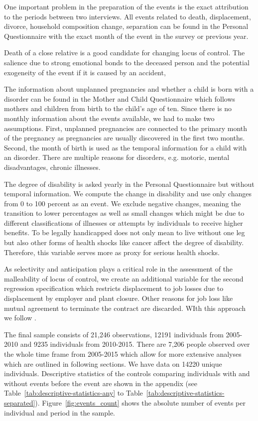 \documentclass[12pt, a4paper, fleqn, parskip]{scrartcl}
\begin{document}
One important problem in the preparation of the events is the exact attribution
to the periods between two interviews. All events related to death,
displacement, divorce, household composition change, separation can be found in
the Personal Questionnaire with the exact month of the event in the survey or
previous year.

Death of a close relative is a good candidate for changing locus of control.
The salience due to strong emotional bonds to the deceased person and the
potential exogeneity of the event if it is caused by an accident,

The information about unplanned pregnancies and whether a child is born with a
disorder can be found in the Mother and Child Questionnaire which follows
mothers and children from birth to the child's age of ten. Since there is no
monthly information about the events available, we had to make two assumptions.
First, unplanned pregnancies are connected to the primary month of the
pregnancy as pregnancies are usually discovered in the first two months.
Second, the month of birth is used as the temporal information for a child with
an disorder. There are multiple reasons for disorders, e.g. motoric, mental
disadvantages, chronic illnesses.

The degree of disability is asked yearly in the Personal Questionnaire but
without temporal information. We compute the change in disability and use only
changes from 0 to 100 percent as an event. We exclude negative changes, meaning
the transition to lower percentages as well as small changes which might be due
to different classifications of illnesses or attempts by individuals to receive
higher benefits. To be legally handicapped does not only mean to live without
one leg but also other forms of health shocks like cancer affect the degree of
disability. Therefore, this variable serves more as proxy for serious health
shocks.

As selectivity and anticipation plays a critical role in the assessment of the
malleability of locus of control, we create an additional variable for the
second regression specification which restricts displacement to job losses due
to displacement by employer and plant closure. Other reasons for job loss like
mutual agreement to terminate the contract are discarded. WIth this approach we
follow \citet{preuss2017}.

The final sample consists of 21,246 observations, 12191 individuals from
2005-2010 and 9235 individuals from 2010-2015. There are 7,206 people observed
over the whole time frame from 2005-2015 which allow for more extensive
analyses which are outlined in following sections. We have data on 14220 unique
individuals. Descriptive statistics of the controls comparing individuals with
and without events before the event are shown in the appendix (see
Table~\ref{tab:descriptive-statistics-any} to
Table~\ref{tab:descriptive-statistics-separated}).
Figure~\ref{fig:events_count} shows the absolute number of events per
individual and period in the sample.
\end{document}
